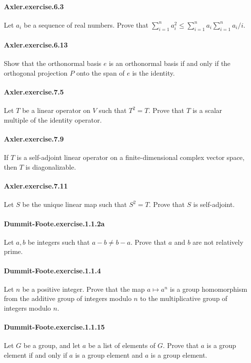 \documentclass{article}
\begin{document}
\paragraph{Axler.exercise.6.3} Let $a_i$ be a sequence of real numbers. Prove that
  $\sum_{i=1}^n a_i^2 \leq \sum_{i=1}^n a_i \sum_{i=1}^n a_i / i$.

\paragraph{Axler.exercise.6.13} Show that the
  orthonormal basis $e$ is an orthonormal basis if and only if the
  orthogonal projection $P$ onto the span of $e$ is the identity.

\paragraph{Axler.exercise.7.5} Let $T$ be a linear operator on $V$ such that $T^2 = T$. Prove that $T$ is a scalar multiple of the identity operator.

\paragraph{Axler.exercise.7.9} If $T$ is a self-adjoint linear operator on a finite-dimensional complex vector space, then $T$ is diagonalizable.

\paragraph{Axler.exercise.7.11} Let $S$ be the unique linear map such that $S^2 = T$. Prove that $S$ is self-adjoint.

\paragraph{Dummit-Foote.exercise.1.1.2a} Let $a, b$ be integers such that $a - b \neq b - a$. Prove that $a$ and $b$ are not relatively prime.

\paragraph{Dummit-Foote.exercise.1.1.4} Let $n$ be a positive integer. Prove that the map $a \mapsto a^n$ is a group homomorphism from the additive group of integers modulo $n$ to the multiplicative group of integers modulo $n$.

\paragraph{Dummit-Foote.exercise.1.1.15} Let $G$ be a group, and let $a$ be a list of elements of $G$. Prove that $a$ is a group element if and only if $a$ is a group element and $a$ is a group element.
\end{document}
